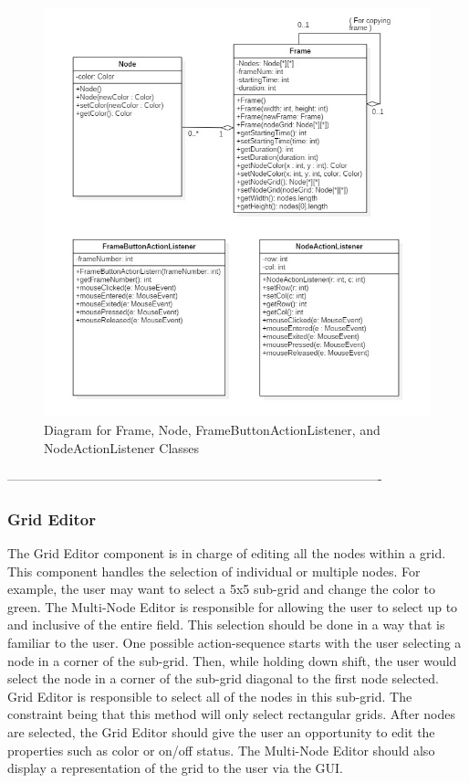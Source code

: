 \documentclass[12pt]{article}
\begin{document}
	\begin{figure}[ht!]
    \centering
    \includegraphics[width=0.9\linewidth]{Class_Diagram_Frame_Node_and_ActionListener_Classes.JPG}
    \caption{Diagram for Frame, Node, FrameButtonActionListener, and NodeActionListener Classes}
  \end{figure}
	
  ----------------------------------------------------------------------------------------
 	\subsubsection {Grid Editor}
  The Grid Editor component is in charge of editing all the nodes within a grid. This component handles the selection of individual or multiple nodes. For example, the user may want to select a 5x5 sub-grid and change the color to green. The Multi-Node Editor is responsible for allowing the user to select up to and inclusive of the entire field. 
  This selection should be done in a way that is familiar to the user. One possible action-sequence starts with the user selecting a node in a corner of the sub-grid. Then, while holding down shift, the user would select the node in a corner of the sub-grid diagonal to the first node selected. Grid Editor is responsible to select all of the nodes in this sub-grid. The constraint being that this method will only select rectangular grids.	
 	After nodes are selected, the Grid Editor should give the user an opportunity to edit the properties such as color or on/off status.   	
 	The Multi-Node Editor should also display a representation of the grid to the user via the GUI.
  
\end{document}
